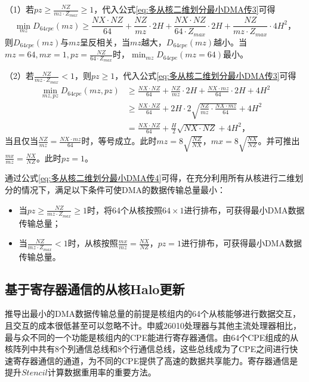 （1）若$pz \ge \frac{NZ}{mz\cdot Z_{max}} \ge 1$，代入公式\ref{eq:多从核二维划分最小DMA传3}可得
\begin{equation}
  \min_{mz} D_{64cpe}(mz) \ge \frac{NX\cdot NZ}{64}+\frac{NZ}{mz}\cdot 2H+\frac{NX\cdot NZ}{64\cdot Z_{max}} \cdot 2H + \frac{NZ}{mz\cdot Z_{max}}\cdot 4H^2，
  \label{eq:多从核二维划分最小DMA传4}
\end{equation}
则$D_{64cpe}(mz) $与$mz$呈反相关，当$mz$越大，$D_{64cpe}(mz) $越小。当$mz=64, mx=1, pz = \frac{NZ}{64\cdot Z_{max}}$时，$\min_{mz} D_{64cpe}(mz=64)$最小。

（2）若$\frac{NZ}{mz\cdot Z_{max}} < 1$，则$pz\ge 1$，代入公式\ref{eq:多从核二维划分最小DMA传3}可得
\begin{equation}
\begin{aligned}
  \min_{mz,pz} D_{64cpe}(mz,pz) &\ge \frac{NX\cdot NZ}{64}+\frac{NZ}{mz}\cdot 2H+\frac{NX\cdot mz}{64} \cdot 2H + 4H^2 \\
  &\ge \frac{NX\cdot NZ}{64}+2H\cdot2\sqrt{\frac{NZ}{mz}\cdot\frac{NX\cdot mz}{64} } + 4H^2 \\
  &=\frac{NX\cdot NZ}{64}+\frac{H}{2}\sqrt{NX\cdot NZ}+ 4H^2
  ，
\end{aligned}
  \label{eq:多从核二维划分最小DMA传5}
\end{equation}
当且仅当$\frac{NZ}{mz}=\frac{NX\cdot mz}{64}$时，等号成立。此时$mz=8\sqrt{\frac{NZ}{NX}}$，$mx=8\sqrt{\frac{NX}{NZ}}$。并可推出$\frac{mx}{mz}=\frac{NX}{NZ}$。此时$pz=1$。

通过公式\ref{eq:多从核二维划分最小DMA传4}可得，在充分利用所有从核进行二维划分的情况下，满足以下条件可使DMA的数据传输总量最小：
\begin{itemize}
  \item 当$pz \ge \frac{NZ}{mz\cdot Z_{max}} \ge 1$时，将64个从核按照$64\times 1$进行排布，可获得最小DMA数据传输总量；
  \item 当$\frac{NZ}{mz\cdot Z_{max}} < 1$时，从核按照$\frac{mx}{mz}=\frac{NX}{NZ}，pz=1$进行排布，可获得最小DMA数据传输总量。
\end{itemize}

\subsection{基于寄存器通信的从核Halo更新}
\label{sub:寄存器通信}

推导出最小的DMA数据传输总量的前提是核组内的64个从核能够进行数据交互，且交互的成本很低甚至可以忽略不计。申威26010处理器与其他主流处理器相比，最与众不同的一个功能是核组内的CPE能进行寄存器通信。由64个CPE组成的从核阵列中共有8个列通信总线和8个行通信总线，这些总线成为了CPE之间进行快速寄存器通信的通道，为不同的CPE提供了高速的数据共享能力。寄存器通信是提升$Stencil$计算数据重用率的重要方法。

